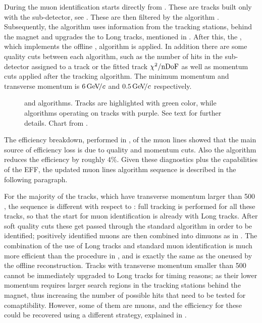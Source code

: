 During \runone the muon identification starts directly from \veloTracks. These are tracks built only with
the \velo sub-detector, see . These \veloTracks are then filtered by the \mvm algorithm
\cite{LHCb-PUB-2011-017}. Subsequently, the \FwD algorithm uses information from the tracking stations, behind
the magnet and upgrades the \veloTracks to Long tracks, mentioned in . After this, the
\isMuon, which implements the offline \muonID, algorithm is applied. In addition there are some quality cuts
between each algorithm, such as the number of hits in the \velo sub-detector assigned to a track or the fitted
track $\chi^2/\rm nDoF$ as well as momentum cuts applied after the \FwD tracking algorithm. The minimum momentum
and transverse momentum is $6 {\mathrm{\,Ge\kern -0.1em V\!/}c}$ and $0.5 {\mathrm{\,Ge\kern -0.1em V\!/}c}$ respectively.

\begin{figure}[t]
  \centering
  \scalebox{0.97}{}
  \scalebox{0.97}{}
 \caption{\runone and \runtwo \hltone algorithms. Tracks are highlighted with green color, while algorithms
           operating on tracks with purple. See text for further details. Chart from \cite{kevinThesis}.}
  \label{hlt1_algo_seq}
\end{figure}

The efficiency breakdown, performed in \cite{kevinThesis}, of the \runone \hltone muon lines showed that the
main source of efficiency loss is due to quality and momentum cuts. Also the \mvm algorithm reduces the
efficiency by roughly $4\%$. Given these diagnostics plus the \runtwo capabilities of the EFF, the updated
\hltone muon lines algorithm sequence is described in the following paragraph.

For the majority of the tracks, which have transverse momentum larger than 500 \mevc, the sequence is different with respect to
\runone: full tracking is performed for all these tracks, so that the start for muon identification is already with Long tracks.
After soft quality cuts these get passed through the standard \isMuon algorithm in order to be identified;
positively identified muons are then combined into dimuons as in \runone.
The combination of the use of Long tracks and standard muon identification is much more efficient than the
procedure in \runone, and is exactly the same as the oneused by the offline reconstruction.
Tracks with transverse momentum smaller than 500 \mevc cannot be immediately upgraded to Long tracks
for timing reasons; as their lower momentum requires larger search regions in the tracking stations
behind the magnet, thus increasing the number of possible hits that need to be tested for comaptibility.
However, some of them are muons, and the efficiency for these could be recovered using a different strategy,
explained in .

